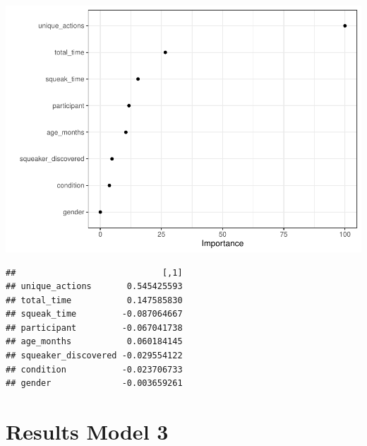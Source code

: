 \documentclass[
  english,
  man]{apa6}
\newenvironment{Shaded}{\begin{snugshade}}{\end{snugshade}}
\newcommand{\AttributeTok}[1]{\textcolor[rgb]{0.77,0.63,0.00}{#1}}
\newcommand{\DecValTok}[1]{\textcolor[rgb]{0.00,0.00,0.81}{#1}}
\newcommand{\FunctionTok}[1]{\textcolor[rgb]{0.00,0.00,0.00}{#1}}
\newcommand{\NormalTok}[1]{#1}
\newcommand{\OtherTok}[1]{\textcolor[rgb]{0.56,0.35,0.01}{#1}}
\newcommand{\SpecialCharTok}[1]{\textcolor[rgb]{0.00,0.00,0.00}{#1}}
\begin{document}
\includegraphics{capstone640_files/figure-latex/unnamed-chunk-5-2.pdf}

\begin{Shaded}
\end{Shaded}

\begin{verbatim}
##                             [,1]
## unique_actions       0.545425593
## total_time           0.147585830
## squeak_time         -0.087064667
## participant         -0.067041738
## age_months           0.060184145
## squeaker_discovered -0.029554122
## condition           -0.023706733
## gender              -0.003659261
\end{verbatim}

\hypertarget{results-model-3}{%
\section{Results Model 3}\label{results-model-3}}
\end{document}
